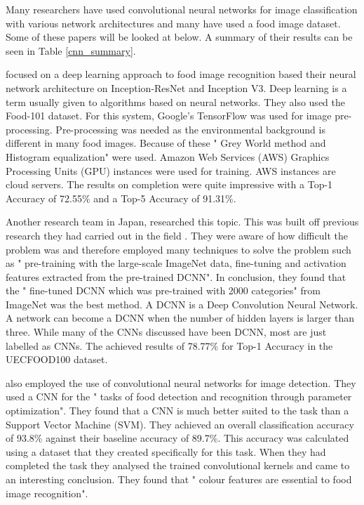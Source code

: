 Many researchers have used convolutional neural networks for image
classification with various network architectures and many have used a food image dataset.
Some of these papers will be looked at below.
A summary of their results can be seen in Table \ref{cnn_summary}.

\parencite{deepLearning} focused on a deep learning approach to food image recognition based
their neural network architecture on Inception-ResNet and Inception V3.
Deep learning is a term usually given to algorithms based on neural networks.
They also used the Food-101 dataset. For this system, Google's
TensorFlow was used for image pre-processing. Pre-processing was needed as the
environmental background is different in many food images. Because of these
" Grey World method and Histogram equalization" \parencite{deepLearning} were
used.
Amazon Web Services (AWS) Graphics Processing Units (GPU) instances were used for training.
AWS instances are cloud servers.
The results on completion were quite impressive with a Top-1 Accuracy of 72.55\% and a Top-5 Accuracy of 91.31\%.

Another research team in Japan, \parencite{yanaiFood} researched this topic. This was built off previous research they had carried out in the field \parencite{kawano2014food}.
They were aware of how
difficult the problem was and therefore employed many techniques to solve the
problem such as " pre-training with the large-scale ImageNet data, fine-tuning
and activation features extracted from the pre-trained DCNN". 
In conclusion, they found that the " fine-tuned DCNN which was pre-trained
with 2000 categories" from ImageNet was the best method. A
DCNN is a Deep Convolution Neural Network. 
A network can become a DCNN when the number of hidden layers is larger than three.
While many of the CNNs discussed have been DCNN, most are just labelled as CNNs.
The achieved results of 78.77\% for Top-1 Accuracy in the UECFOOD100 dataset.


\parencite{kagayaFood} also employed the use of convolutional neural networks for
image detection. They used a CNN for the " tasks of food detection and recognition
through parameter optimization".
They found that a CNN is much better suited to the task than a Support Vector
Machine (SVM). They achieved an overall classification accuracy of 93.8\%
against their baseline accuracy of 89.7\%. This accuracy
was calculated using a dataset that they created specifically for this task.
When they had completed the task they analysed the trained convolutional kernels
and came to an interesting conclusion. They found that " colour features are
essential to food image recognition".


